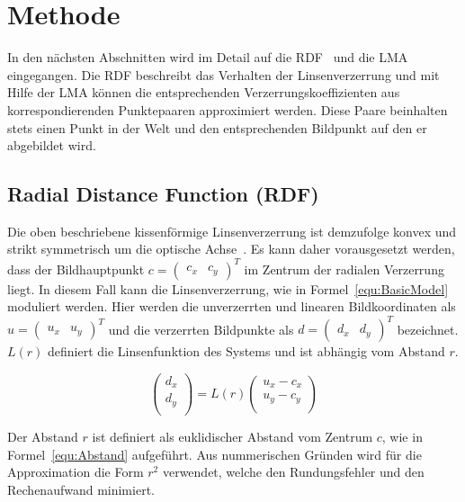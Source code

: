 
\section{Methode}
\label{Methode}
In den nächsten Abschnitten wird im Detail auf die RDF~\cite{HartleyRadDist} und die LMA~\cite{LevMarquardt} eingegangen. Die RDF beschreibt das Verhalten der Linsenverzerrung und mit Hilfe der LMA können die entsprechenden Verzerrungskoeffizienten aus korrespondierenden Punktepaaren  approximiert werden. Diese Paare beinhalten stets einen Punkt in der Welt und den entsprechenden Bildpunkt auf den er abgebildet wird.

\subsection{Radial Distance Function (RDF)}
\label{sec:RDF}
Die oben beschriebene kissenförmige Linsenverzerrung ist demzufolge konvex und strikt symmetrisch um die optische Achse~\cite{WengRadDist}. Es kann daher vorausgesetzt werden, dass der Bildhauptpunkt $c= \begin{pmatrix}
c_x & c_y
\end{pmatrix}^T$ im Zentrum der radialen Verzerrung liegt. In diesem Fall kann die Linsenverzerrung, wie in Formel~\ref{equ:BasicModel} moduliert werden. Hier werden die unverzerrten und linearen Bildkoordinaten als $u= \begin{pmatrix}
u_x & u_y
\end{pmatrix}^T$ und die verzerrten Bildpunkte als $d= \begin{pmatrix}
d_x & d_y
\end{pmatrix}^T$ bezeichnet. $L(r)$ definiert die Linsenfunktion des Systems und ist abhängig vom Abstand $r$.

\begin{equation}
\label{equ:BasicModel}
\begin{pmatrix}
d_x \\
d_y\\
\end{pmatrix} =
L(r)
\begin{pmatrix}
u_x-c_x\\
u_y -c_y\\
\end{pmatrix}
\end{equation}

Der Abstand $r$ ist definiert als euklidischer Abstand vom Zentrum $c$, wie in Formel~\ref{equ:Abstand} aufgeführt. Aus nummerischen Gründen wird für die Approximation die Form $r^2$ verwendet, welche den Rundungsfehler und den Rechenaufwand minimiert. 

